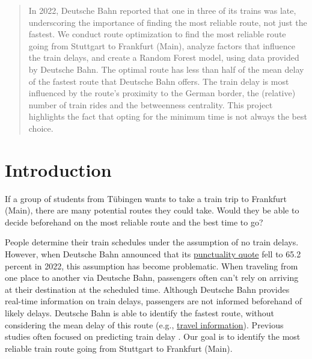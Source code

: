 \documentclass{article}
\theoremstyle{plain}
\theoremstyle{definition}
\theoremstyle{remark}
\begin{document}
\printAffiliationsAndNotice{\icmlEqualContribution} %

\begin{abstract}
In 2022, Deutsche Bahn reported that one in three of its trains was late, underscoring the importance of finding the most reliable route, not just the fastest. We conduct route optimization to find the most reliable route going from Stuttgart to Frankfurt (Main), analyze factors that influence the train delays, and create a Random Forest model, using data provided by Deutsche Bahn. The optimal route has less than half of the mean delay of the fastest route that Deutsche Bahn offers. The train delay is most influenced by the route's proximity to the German border, the (relative) number of train rides and the betweenness centrality. This project highlights the fact that opting for the minimum time is not always the best choice.
\end{abstract}

\section{Introduction}\label{sec:intro}
If a group of students from Tübingen wants to take a train trip to Frankfurt (Main), there are many potential routes they could take. Would they be able to decide beforehand on the most reliable route and the best time to go?

People determine their train schedules under the assumption of no train delays. However, when Deutsche Bahn announced that its \href{https://zbir.deutschebahn.com/2023/en/interim-group-management-report-unaudited/product-quality-and-digitalization/punctuality/}{punctuality quote} fell to 65.2 percent in 2022, this assumption has become problematic. When traveling from one place to another via Deutsche Bahn, passengers often can't rely on arriving at their destination at the scheduled time. Although Deutsche Bahn provides real-time information on train delays, passengers are not informed beforehand of likely delays. Deutsche Bahn is able to identify the fastest route, without considering the mean delay of this route (e.g., \href{https://www.bahn.de/buchung/intern/start}{travel information}). Previous studies often focused on predicting train delay \cite{predtraindelay, largetrainnet, MLtraindel}. Our goal is to identify the most reliable train route going from Stuttgart to Frankfurt (Main).
\end{document}
